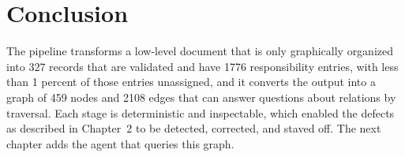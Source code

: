 \section*{Conclusion}
The pipeline transforms a low-level document that is only graphically organized into 327 records that are validated and have 1776 responsibility entries, with less than 1 percent of those entries unassigned, and it converts the output into a graph of 459 nodes and 2108 edges that can answer questions about relations by traversal. Each stage is deterministic and inspectable, which enabled the defects as described in Chapter~2 to be detected, corrected, and staved off. The next chapter adds the agent that queries this graph.